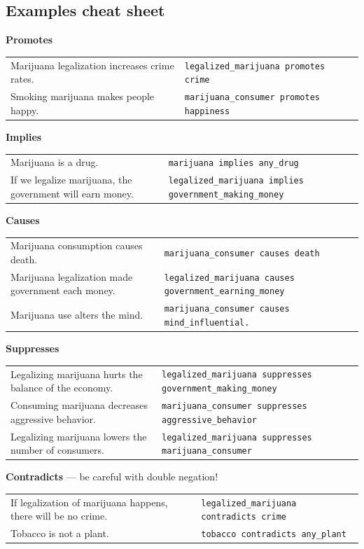 \subsection*{Examples cheat sheet}

\noindent \textbf{Promotes} \\
\begin{tabular}{p{8cm} p{8cm}}
Marijuana legalization increases crime rates. & \texttt{legalized\_marijuana promotes crime} \\
Smoking marijuana makes people happy. & \texttt{marijuana\_consumer promotes happiness}
\end{tabular}

\noindent \textbf{Implies} \\
\begin{table}[h!]
\begin{tabular}{p{8cm} p{8cm}}
Marijuana is a drug. & \texttt{marijuana implies any\_drug} \\
	If we legalize marijuana, the government will earn money.  &\texttt{legalized\_marijuana implies government\_making\_money}
\end{tabular}
\end{table}
 
\noindent \textbf{Causes} \\
\begin{tabular}{p{8cm} p{8cm}}
	Marijuana consumption causes death. & \texttt{marijuana\_consumer causes death}  \\
	Marijuana legalization made government each money. & \texttt{legalized\_marijuana causes government\_earning\_money}\\
	Marijuana use alters the mind. & \texttt{marijuana\_consumer causes mind\_influential. }
\end{tabular}

\noindent \textbf{Suppresses}  \\
\begin{tabular}{p{8cm} p{8cm}}
	Legalizing marijuana hurts the balance of the economy. & \texttt{legalized\_marijuana suppresses government\_making\_money} \\
	Consuming marijuana decreases aggressive behavior. & \texttt{marijuana\_consumer suppresses aggressive\_behavior} \\
	Legalizing marijuana lowers the number of consumers. & \texttt{legalized\_marijuana suppresses marijuana\_consumer}
\end{tabular}

\noindent \textbf{Contradicts} --- be careful with double negation! \\
\begin{tabular}{p{8cm} p{8cm}}
	If legalization of marijuana happens, there will be no crime. & \texttt{legalized\_marijuana contradicts crime} \\
	Tobacco is not a plant. & \texttt{tobacco contradicts any\_plant}
\end{tabular}

